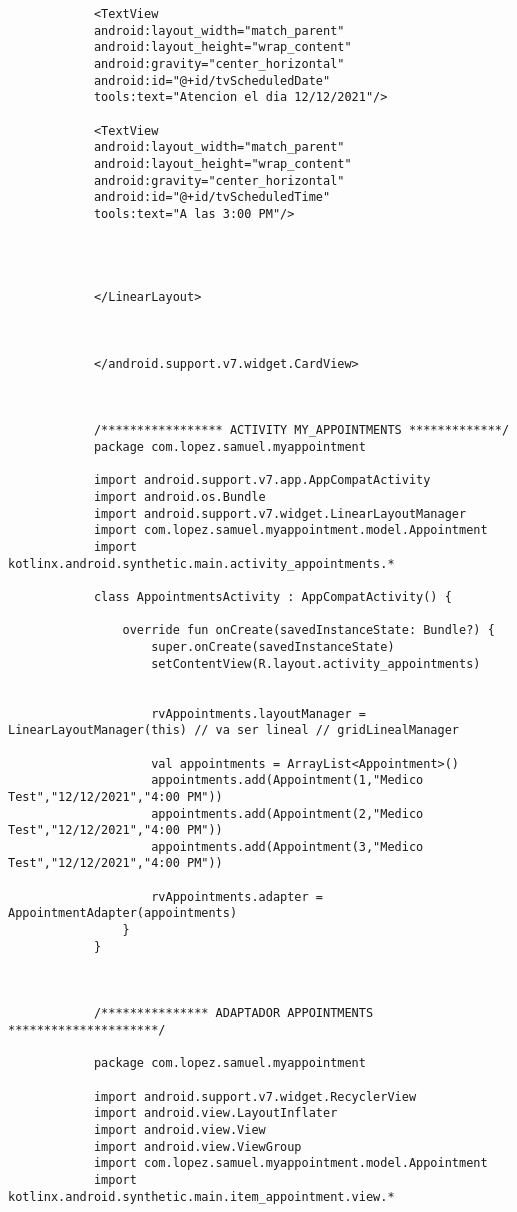 \documentclass[a4paper]{article}
\begin{document}
\begin{lstlisting}
			<TextView
			android:layout_width="match_parent"
			android:layout_height="wrap_content"
			android:gravity="center_horizontal"
			android:id="@+id/tvScheduledDate"
			tools:text="Atencion el dia 12/12/2021"/>
			
			<TextView
			android:layout_width="match_parent"
			android:layout_height="wrap_content"
			android:gravity="center_horizontal"
			android:id="@+id/tvScheduledTime"
			tools:text="A las 3:00 PM"/>
			
			
			
			
			</LinearLayout>
			
			
			
			</android.support.v7.widget.CardView>
			
			
			
			/***************** ACTIVITY MY_APPOINTMENTS *************/
			package com.lopez.samuel.myappointment
			
			import android.support.v7.app.AppCompatActivity
			import android.os.Bundle
			import android.support.v7.widget.LinearLayoutManager
			import com.lopez.samuel.myappointment.model.Appointment
			import kotlinx.android.synthetic.main.activity_appointments.*
			
			class AppointmentsActivity : AppCompatActivity() {
				
				override fun onCreate(savedInstanceState: Bundle?) {
					super.onCreate(savedInstanceState)
					setContentView(R.layout.activity_appointments)
					
					
					rvAppointments.layoutManager = LinearLayoutManager(this) // va ser lineal // gridLinealManager
					
					val appointments = ArrayList<Appointment>()
					appointments.add(Appointment(1,"Medico Test","12/12/2021","4:00 PM"))
					appointments.add(Appointment(2,"Medico Test","12/12/2021","4:00 PM"))
					appointments.add(Appointment(3,"Medico Test","12/12/2021","4:00 PM"))
					
					rvAppointments.adapter = AppointmentAdapter(appointments)
				}
			}
			
			
			
			/*************** ADAPTADOR APPOINTMENTS *********************/
			
			package com.lopez.samuel.myappointment
			
			import android.support.v7.widget.RecyclerView
			import android.view.LayoutInflater
			import android.view.View
			import android.view.ViewGroup
			import com.lopez.samuel.myappointment.model.Appointment
			import kotlinx.android.synthetic.main.item_appointment.view.*
			

\end{lstlisting}
\end{document}
